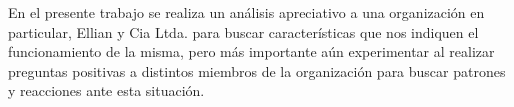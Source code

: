En el presente trabajo se realiza un análisis apreciativo a una organización en particular,
Ellian y Cia Ltda. para buscar características que nos indiquen el funcionamiento de la misma,
pero más importante aún experimentar al realizar preguntas positivas a distintos miembros de la
organización para buscar patrones y reacciones ante esta situación.

